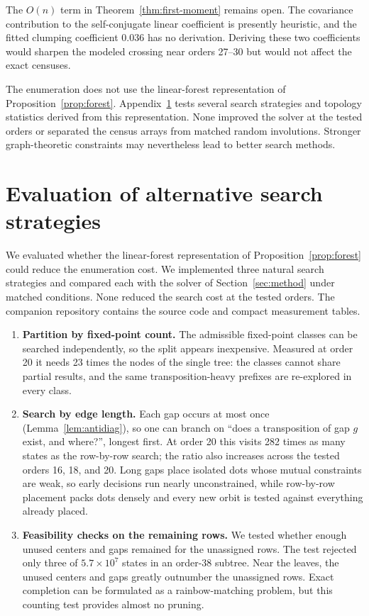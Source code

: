 \documentclass[11pt]{article}
\begin{document}
The $O(n)$ term in Theorem~\ref{thm:first-moment} remains open.
The covariance contribution to the self-conjugate linear coefficient is
presently heuristic, and the fitted clumping coefficient $0.036$ has no
derivation.  Deriving these two coefficients would sharpen the modeled
crossing near orders 27--30 but would not affect the exact censuses.

The enumeration does not use the linear-forest representation of
Proposition~\ref{prop:forest}.  Appendix~\ref{app:negative} tests several
search strategies and topology statistics derived from this representation.
None improved the solver at the tested orders or separated the census arrays
from matched random involutions.  Stronger graph-theoretic constraints may
nevertheless lead to better search methods.

\appendix

\section{Evaluation of alternative search strategies}
\label{app:negative}

We evaluated whether the linear-forest representation of
Proposition~\ref{prop:forest} could reduce the enumeration cost.  We
implemented three natural search strategies and compared each with the
solver of Section~\ref{sec:method} under matched conditions.  None
reduced the search cost at the tested orders.  The companion repository
contains the source code and compact measurement tables.

\begin{enumerate}
\item \textbf{Partition by fixed-point count.}  The admissible fixed-point
classes can be searched independently, so the split appears inexpensive.
Measured at order 20 it needs 23 times the nodes of the single tree: the
classes cannot share partial results, and the same transposition-heavy
prefixes are re-explored in every class.
\item \textbf{Search by edge length.}  Each gap occurs at most once
(Lemma~\ref{lem:antidiag}), so one can branch on ``does a transposition
of gap $g$ exist, and where?'', longest first.  At order 20 this visits
282 times as many states as the row-by-row search; the ratio also increases
across the tested orders 16, 18, and 20.  Long gaps place isolated dots whose mutual
constraints are weak, so early decisions run nearly unconstrained, while
row-by-row placement packs dots densely and every new orbit is tested
against everything already placed.
\item \textbf{Feasibility checks on the remaining rows.}  We tested whether
enough unused centers and gaps remained for the unassigned rows.  The test
rejected only three of $5.7\times 10^{7}$ states in an order-38 subtree.
Near the leaves, the unused centers and gaps greatly outnumber the unassigned
rows.  Exact completion can be formulated as a rainbow-matching problem, but
this counting test provides almost no pruning.
\end{enumerate}
\end{document}
